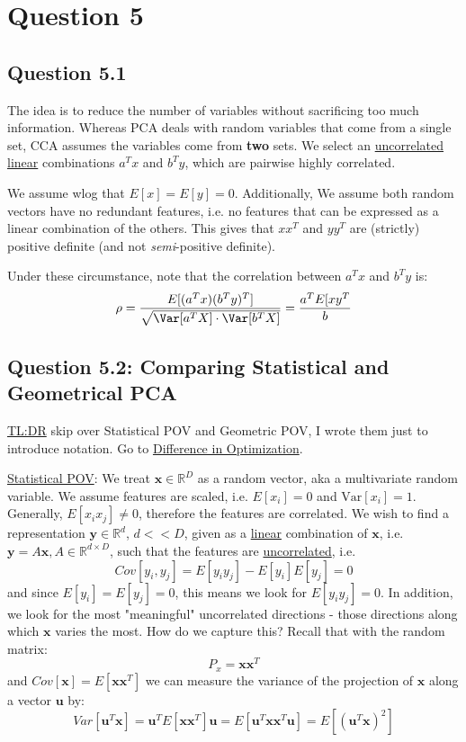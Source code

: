 \documentclass{article}
\begin{document}
\section*{Question 5}
\subsection*{Question 5.1}
The idea is to reduce the number of variables without sacrificing too much information. 
Whereas PCA deals with random variables that come from a single set, CCA assumes the variables come from \textbf{two} sets. We select an \ul{uncorrelated} \ul{linear} combinations $a^{T}x$ and $b^{T}y$, which are pairwise highly correlated.


We assume wlog that $E[x] = E[y] = 0$. Additionally, We assume both random vectors have no redundant features, i.e. no features that can be expressed as a linear combination of the others. This gives that $xx^{T}$ and $yy^{T}$ are (strictly) positive definite (and not \textit{semi}-positive definite). 


Under these circumstance, note that   the correlation between $a^{T}x$ and $b^{T}y$ is:
\[
  \rho = \frac{E[(a^{T}x)(b^{T}y)^{T}]}{\sqrt{ \Var[a^{T}X] \cdot \Var[b^{T}X] } } = \frac{a^{T} E[x y^{T}}{b}
\]


\subsection*{Question 5.2: Comparing Statistical and Geometrical PCA}
\ul{TL:DR} skip over Statistical POV and Geometric POV, I wrote them just to introduce notation. Go to \ul{Difference in Optimization}. 


\ul{Statistical POV}: We treat $\bm{x} \in \mathbb{R}^{D}$ as a random vector, aka a multivariate random variable. We assume features are scaled, i.e. $E[x_i]=0$ and $\text{Var}[x_i]=1$.  Generally, $E[x_i x_j] \neq 0$, therefore the features are correlated. We wish to find a representation $\bm{y} \in \mathbb{R}^{d}$, $d <<D$, given as a \ul{linear} combination of $\bm{x}$, i.e. $\bm{y}=A \bm{x}, A \in \mathbb{R}^{d \times D}$, such that the features are \ul{uncorrelated}, i.e.
\[
  Cov[y_i,y_j]= E[y_i y_j] - E[y_i] E[y_j] =  0
\]
and since $E[y_i]=E[y_j]=0$, this means we look for $E[y_i y_j]=0$. In addition, we look for the most "meaningful" uncorrelated directions - those directions along which $\bm{x}$ varies the most. How do we capture this? Recall that with the random matrix:
\[
  P_{x} = \bm{x} \bm{x}^{T}
\]
and $Cov[\bm{x}] = E[\bm{x} \bm{x}^{T}]$
we can measure the variance of the projection of $\bm{x}$ along a vector $\bm{u}$ by:
\[
  Var[\bm{u} ^{T} \bm{x}] = \bm{u}^{T} E[\bm{x} \bm{x}^{T}] \bm{u} = E[\bm{u}^{T} \bm{x} \bm{x} ^{T} \bm{u}] = E[(\bm{u}^{T} \bm{x}) ^2]
\]
\end{document}
